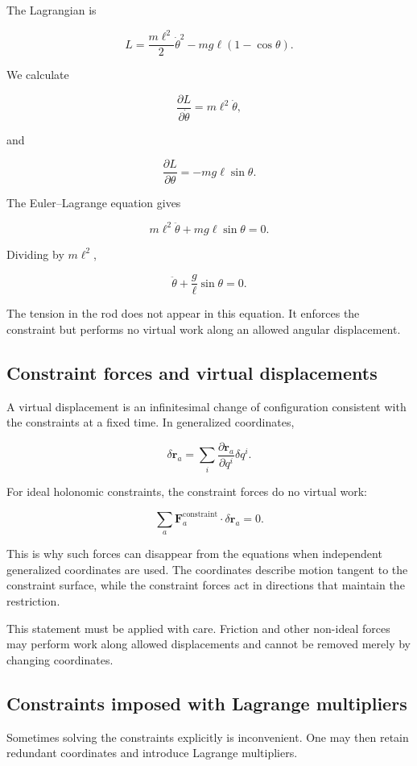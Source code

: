 The Lagrangian is

\[
L
=
\frac{m\ell^{2}}{2}\dot\theta^{2}
-
mg\ell(1-\cos\theta).
\]

We calculate

\[
\frac{\partial L}{\partial\dot\theta}
=
m\ell^{2}\dot\theta,
\]

and

\[
\frac{\partial L}{\partial\theta}
=
-mg\ell\sin\theta.
\]

The Euler--Lagrange equation gives

\[
m\ell^{2}\ddot\theta
+
mg\ell\sin\theta
=0.
\]

Dividing by \(m\ell^{2}\),

\[
\boxed{
\ddot\theta
+
\frac{g}{\ell}\sin\theta
=0
}.
\]

The tension in the rod does not appear in this equation. It enforces the constraint but performs no virtual work along an allowed angular displacement.

\subsection{Constraint forces and virtual displacements}

A virtual displacement is an infinitesimal change of configuration consistent with the constraints at a fixed time. In generalized coordinates,

\[
\delta\mathbf{r}_{a}
=
\sum_{i}
\frac{\partial\mathbf{r}_{a}}{\partial q^{i}}
\delta q^{i}.
\]

For ideal holonomic constraints, the constraint forces do no virtual work:

\[
\sum_{a}
\mathbf{F}^{\mathrm{constraint}}_{a}
\cdot
\delta\mathbf{r}_{a}
=0.
\]

This is why such forces can disappear from the equations when independent generalized coordinates are used. The coordinates describe motion tangent to the constraint surface, while the constraint forces act in directions that maintain the restriction.

This statement must be applied with care. Friction and other non-ideal forces may perform work along allowed displacements and cannot be removed merely by changing coordinates.

\subsection{Constraints imposed with Lagrange multipliers}

Sometimes solving the constraints explicitly is inconvenient. One may then retain redundant coordinates and introduce Lagrange multipliers.

